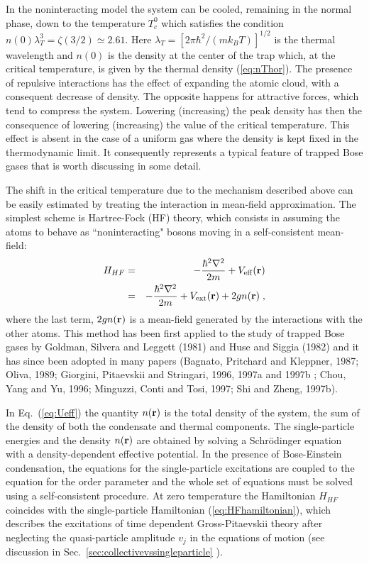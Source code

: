 In the noninteracting model the system can be cooled, remaining in
the normal phase, down to the temperature $T_c^0$ which satisfies the
condition $n(0) \lambda_T^3 = \zeta(3/2) \simeq 2.61$. Here 
$\lambda_T=[2\pi\hbar^2/ (mk_BT)]^{1/2}$ is the thermal wavelength and
$n(0)$ is the density at the center of the trap which, at the critical
temperature, is given by the thermal density (\ref{eq:nThor}).
The presence of repulsive interactions has  the  effect of expanding
the atomic cloud, with a consequent decrease of density. The opposite
happens for attractive forces, which tend to compress the system.  
Lowering (increasing) the  peak  density has  then the consequence of
lowering  (increasing) the value of the critical temperature. This
effect is absent in the case of a uniform gas where
the density is kept fixed in the thermodynamic limit. It consequently
represents a typical feature of trapped Bose gases that is worth
discussing in some detail.

The shift in the critical temperature due to the mechanism described
above can be easily estimated by treating the interaction in mean-field
approximation. The simplest scheme is Hartree-Fock (HF) theory, which
consists in assuming the atoms to behave as ``noninteracting"  bosons 
moving in a self-consistent mean-field: 
\begin{eqnarray}
H_{HF} &=& -\frac{\hbar^2\nabla^2}{2m} + V_{\rm eff}({\bf r})
\nonumber \\
&=& -\frac{\hbar^2\nabla^2}{2m} + V_{\rm ext}({\bf r}) + 2gn({\bf r}) \; ,
\label{eq:Ueff}
\end{eqnarray}
where the last term, $2gn({\bf r})$ is a mean-field generated by the
interactions with the other atoms.  This method has been first applied 
to the study of trapped Bose gases by Goldman, Silvera and Leggett (1981) 
and Huse and Siggia (1982) and it has since been adopted in many papers 
(Bagnato, Pritchard and Kleppner, 1987; Oliva, 1989;
Giorgini, Pitaevskii and Stringari, 1996, 1997a and 1997b ;  Chou, 
Yang and Yu, 1996; Minguzzi, Conti and Tosi, 1997; Shi and Zheng, 1997b).

In Eq.~(\ref{eq:Ueff}) the quantity $n({\bf r})$ is the total density of 
the system, the sum of the density of both the condensate and thermal 
components. The single-particle energies and the density $n({\bf r})$ are 
obtained by solving a Schr\"odinger equation with a density-dependent
effective potential.  In the presence of  Bose-Einstein  condensation, the
equations for the single-particle excitations are coupled to the equation
for the order parameter and the whole set of equations must be solved using
a self-consistent procedure.  At zero temperature the Hamiltonian
$H_{HF}$ coincides with the  single-particle Hamiltonian
(\ref{eq:HFhamiltonian}), which describes the excitations of time dependent
Gross-Pitaevskii theory after neglecting the quasi-particle amplitude
$v_j$ in the equations of motion (see discussion in
Sec.~\ref{sec:collectivevssingleparticle} ).  

